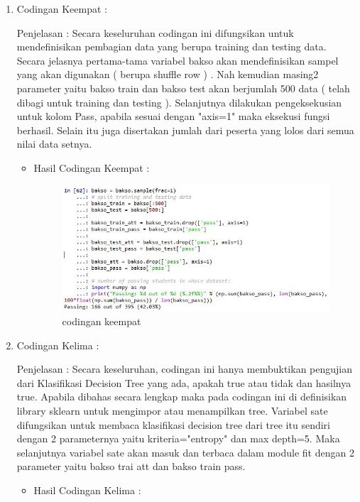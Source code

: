 \begin{enumerate}
\begin{enumerate}
\begin{itemize}
\end{itemize}
\par
\item Codingan Keempat :
\par Penjelasan : Secara keseluruhan codingan ini difungsikan untuk mendefinisikan pembagian data yang berupa training dan testing data. Secara jelasnya pertama-tama variabel bakso akan mendefinisikan sampel yang akan digunakan ( berupa shuffle row ) . Nah kemudian masing2 parameter yaitu bakso train dan bakso test akan berjumlah 500 data ( telah dibagi untuk training dan testing ). Selanjutnya dilakukan pengeksekusian untuk kolom Pass, apabila sesuai dengan "axis=1" maka eksekusi fungsi berhasil. Selain itu juga disertakan jumlah dari peserta yang lolos dari semua nilai data setnya.  
\par 
\begin{itemize}
\par
\item Hasil Codingan Keempat :

\begin{figure}[ht]
\centering
\includegraphics[scale=0.4]{figures/hasil4.jpg}
\caption{codingan keempat}
\label{contoh}
\end{figure}

\end{itemize}
\par
\item Codingan Kelima :
\par Penjelasan : Secara keseluruhan, codingan ini hanya membuktikan pengujian dari Klasifikasi Decision Tree yang ada, apakah true atau tidak dan hasilnya true. Apabila dibahas secara lengkap maka pada codingan ini di definisikan library sklearn untuk mengimpor atau menampilkan tree. Variabel sate difungsikan untuk membaca klasifikasi decision tree dari tree itu sendiri dengan 2 parameternya yaitu kriteria="entropy" dan max depth=5. Maka selanjutnya variabel sate akan masuk dan terbaca dalam module fit dengan 2 parameter yaitu bakso trai att dan bakso train pass.
\par 
\begin{itemize}
\par
\item Hasil Codingan Kelima :


\end{itemize}
\end{enumerate}
\end{enumerate}
